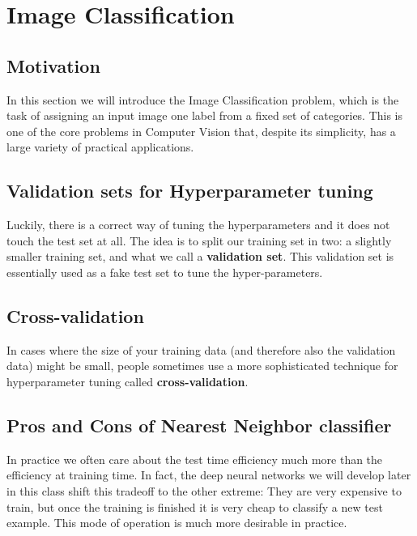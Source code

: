 \documentclass{report}
\begin{document}
	
	\section{Image Classification}
	
	\subsection{Motivation}
	
	In this section we will introduce the Image Classification problem, which is the task of assigning an input image one label from a fixed set of categories. This is one of the core problems in Computer Vision that, despite its simplicity, has a large variety of practical applications. 
	
	\subsection{Validation sets for Hyperparameter tuning}
	
	Luckily, there is a correct way of tuning the hyperparameters and it does not touch the test set at all. The idea is to split our training set in two: a slightly smaller training set, and what we call a \textbf{validation set}. This validation set is essentially used as a fake test set to tune the hyper-parameters.
	
	
	\subsection{Cross-validation}
	
	In cases where the size of your training data (and therefore also the validation data) might be small, people sometimes use a more sophisticated technique for hyperparameter tuning called \textbf{cross-validation}. 
	
	
	\subsection{Pros and Cons of Nearest Neighbor classifier}
	
	In practice we often care about the test time efficiency much more than the efficiency at training time. In fact, the deep neural networks we will develop later in this class shift this tradeoff to the other extreme: They are very expensive to train, but once the training is finished it is very cheap to classify a new test example. This mode of operation is much more desirable in practice.
	
\end{document}
